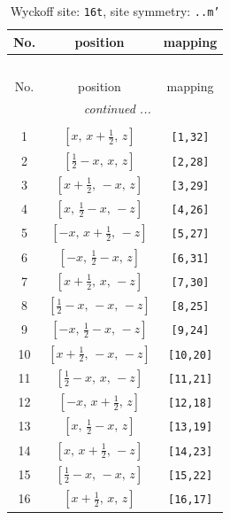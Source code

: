 \documentclass[fleqn,8pt]{jsarticle}
\begin{document}
\renewcommand{\arraystretch}{1.2}
\begin{longtable}{ccc}
\caption{Wyckoff site: {\tt 16t}, site symmetry: {\tt ..m'}}
 \\
 \hline \hline
No. & position & mapping \\ \hline \endfirsthead

\multicolumn{2}{l}{\tablename\ \thetable{}} \\
 \hline \hline
No. & position & mapping \\ \hline \endhead

 \hline \hline
\multicolumn{2}{r}{\footnotesize\it continued ...} \\ \endfoot

 \hline \hline
\multicolumn{2}{r}{} \\ \endlastfoot

1 & $\left[ x,\, x + \frac{1}{2},\, z \right]$ & {\tt [1,32]} \\ \hline
2 & $\left[ \frac{1}{2} - x,\, x,\, z \right]$ & {\tt [2,28]} \\ \hline
3 & $\left[ x + \frac{1}{2},\, - x,\, z \right]$ & {\tt [3,29]} \\ \hline
4 & $\left[ x,\, \frac{1}{2} - x,\, - z \right]$ & {\tt [4,26]} \\ \hline
5 & $\left[ - x,\, x + \frac{1}{2},\, - z \right]$ & {\tt [5,27]} \\ \hline
6 & $\left[ - x,\, \frac{1}{2} - x,\, z \right]$ & {\tt [6,31]} \\ \hline
7 & $\left[ x + \frac{1}{2},\, x,\, - z \right]$ & {\tt [7,30]} \\ \hline
8 & $\left[ \frac{1}{2} - x,\, - x,\, - z \right]$ & {\tt [8,25]} \\ \hline
9 & $\left[ - x,\, \frac{1}{2} - x,\, - z \right]$ & {\tt [9,24]} \\ \hline
10 & $\left[ x + \frac{1}{2},\, - x,\, - z \right]$ & {\tt [10,20]} \\ \hline
11 & $\left[ \frac{1}{2} - x,\, x,\, - z \right]$ & {\tt [11,21]} \\ \hline
12 & $\left[ - x,\, x + \frac{1}{2},\, z \right]$ & {\tt [12,18]} \\ \hline
13 & $\left[ x,\, \frac{1}{2} - x,\, z \right]$ & {\tt [13,19]} \\ \hline
14 & $\left[ x,\, x + \frac{1}{2},\, - z \right]$ & {\tt [14,23]} \\ \hline
15 & $\left[ \frac{1}{2} - x,\, - x,\, z \right]$ & {\tt [15,22]} \\ \hline
16 & $\left[ x + \frac{1}{2},\, x,\, z \right]$ & {\tt [16,17]} \\
\end{longtable}
\end{document}
